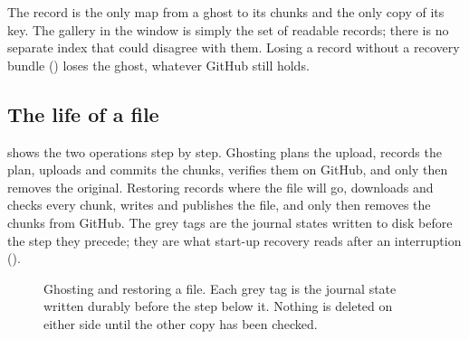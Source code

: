 The record is the only map from a ghost to its chunks and the only copy of its key. The gallery
in the window is simply the set of readable records; there is no separate index that could
disagree with them. Losing a record without a recovery bundle () loses the
ghost, whatever GitHub still holds.

\subsection{The life of a file}
 shows the two operations step by step. Ghosting plans the upload, records
the plan, uploads and commits the chunks, verifies them on GitHub, and only then removes the
original. Restoring records where the file will go, downloads and checks every chunk, writes and
publishes the file, and only then removes the chunks from GitHub. The grey tags are the journal
states written to disk before the step they precede; they are what start-up recovery reads after
an interruption ().

\begin{figure}[t]
\centering

\caption{Ghosting and restoring a file. Each grey tag is the journal state written durably before
the step below it. Nothing is deleted on either side until the other copy has been checked.}
\label{fig:lifecycle}
\end{figure}
